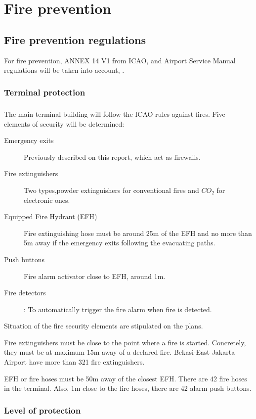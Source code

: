 \chapter{Fire prevention}
	\section{Fire prevention regulations }
	For fire prevention, ANNEX 14 V1 from ICAO, \cite{Standards2016} and Airport Service Manual regulations will be taken into account, \cite{InternationalCivilAviationOrganisation2014}.
		\subsection{Terminal protection}
		\paragraph{} The main terminal building will follow the ICAO rules against fires. Five elements of security will be determined:
		
		\begin{description}
			\item[Emergency exits] Previously described on this report, which act as firewalls.
			\item[Fire extinguishers] Two types,powder extinguishers for conventional fires and $CO_2$ for electronic ones.
			\item[Equipped Fire Hydrant (EFH)] Fire extinguishing hose must be around 25m of the EFH and no more than 5m away if the emergency exits following the evacuating paths.
			\item[Push buttons] Fire alarm activator close to EFH, around 1m.
			\item[Fire detectors]: To automatically trigger the fire alarm when fire is detected.
		\end{description}
	Situation of the fire security elements are stipulated on the plans.
	
	Fire extinguishers must be close to the point where a fire is started. Concretely, they must be at maximum 15m away of a declared fire. Bekasi-East Jakarta Airport have more than 321 fire extinguishers.
	
	EFH or fire hoses must be 50m away of the closest EFH. There are 42 fire hoses in the terminal. Also, 1m close to the fire hoses, there are 42 alarm push buttons.
	
		\subsection{Level of protection}
